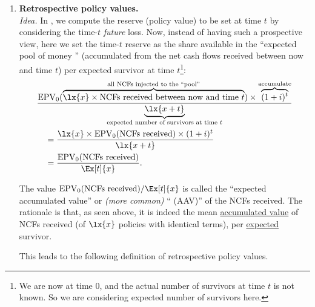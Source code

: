 \begin{enumerate}
\subsubsection*{Theme 2: Other types of policy values}
\item \textbf{Retrospective policy values.} \\
\emph{Idea.} In , we compute the reserve (policy
value) to be set at time \(t\) by considering the time-\(t\) \emph{future}
loss. Now, instead of having such a prospective view, here we set the
time-\(t\) reserve as the share  available in the
``expected pool of money '' (accumulated from the net
cash flows received between now and time \(t\)) per expected survivor
at time \(t\)\footnote{We are now at time 0, and the actual number of
survivors at time \(t\) is not known. So we are considering expected
number of survivors here.}:
\begin{align*}
& \frac{\epvt{0}{
\overbrace{\lx{x}\times \text{NCFs received between now and time \(t\)}}^{\text{all NCFs injected to the ``pool''}}}
\times \overbrace{(1+i)^{t}}^{\text{accumulate}}}
{\underbrace{\lx{x+t}}_{\text{expected number of survivors at time \(t\)}}}\\
&\quad=\frac{\lx{x}\times \epvt{0}{\text{NCFs received}}\times (1+i)^{t}}{\lx{x+t}} \\
&\quad=\frac{\epvt{0}{\text{NCFs received}}}{\Ex[t]{x}}.
\end{align*}
\begin{note}
The value \(\epvt{0}{\text{NCFs received}}/\Ex[t]{x}\) is called the ``expected
accumulated value'' or \emph{(more common)} `` (AAV)'' of the NCFs received. The rationale is that, as seen above, it
is indeed the mean \underline{accumulated value} of NCFs received (of
\(\lx{x}\) policies with identical terms), per \underline{expected} survivor.
\end{note}

This leads to the following definition of retrospective policy values.


\end{enumerate}
